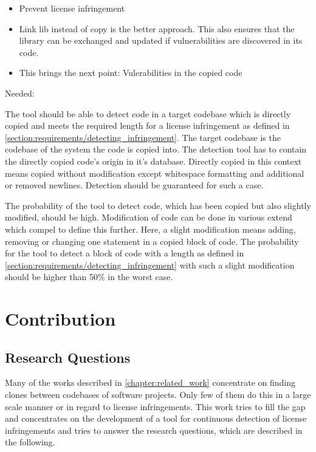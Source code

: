 \begin{itemize}
	\item Prevent license infringement
	\item Link lib instead of copy is the better approach. This also ensures that the library can be exchanged and updated if vulnerabilities are discovered in its code.
	\item This brings the next point: Vulerabilities in the copied code
\end{itemize}

Needed:

The tool should be able to detect code in a target codebase which is directly copied and meets the required length for a license infringement as defined in \autoref{section:requirements/detecting_infringement}.
The target codebase is the codebase of the system the code is copied into.
The detection tool has to contain the directly copied code's origin in it's database.
Directly copied in this context means copied without modification except whitespace formatting and additional or removed newlines.
Detection should be guaranteed for such a case.

The probability of the tool to detect code, which has been copied but also slightly modified, should be high.
Modification of code can be done in various extend which compel to define this further.
Here, a slight modification means adding, removing or changing one statement in a copied block of code.
The probability for the tool to detect a block of code with a length as defined in \autoref{section:requirements/detecting_infringement} with such a slight modification should be higher than 50\% in the worst case. %


\section{Contribution}
\subsection*{Research Questions}\label{section:introduction/research_questions}
Many of the works described in \autoref{chapter:related_work} concentrate on finding clones between codebases of software projects.
Only few of them do this in a large scale manner or in regard to license infringements.
This work tries to fill the gap and concentrates on the development of a tool for continuous detection of license infringements and tries to answer the research questions, which are described in the following.

